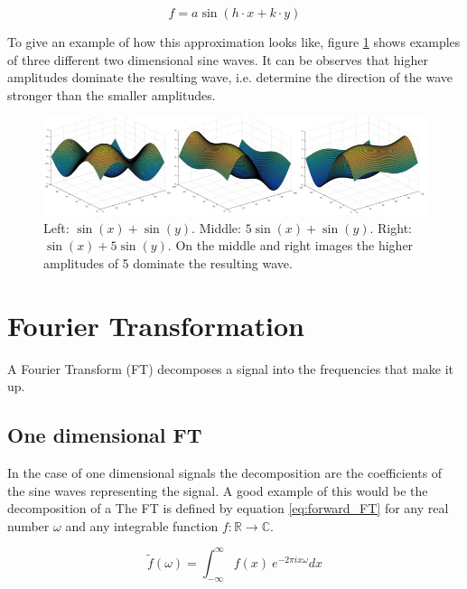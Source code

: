 \begin{equation}
	f = a \sin(h\cdot x+k\cdot y)
	\label{eq:2d_sine}
\end{equation}

To give an example of how this approximation looks like, figure \ref{fig:2d_sine} shows examples of three different two dimensional sine waves. It can be observes that higher amplitudes dominate the resulting wave, i.e. determine the direction of the wave stronger than the smaller amplitudes. 


\begin{figure}[!htb]
	\centering
	\includegraphics[width = \textwidth]{images/2d_sine.jpg}
	\caption{Left: $\sin(x) +\sin(y)$. Middle:  $5 \sin(x)+ \sin(y)$. Right: $	\sin(x)+5\sin(y)$. On the middle and right images the higher amplitudes of 5 dominate the resulting wave. \protect\footnotemark}
	\label{fig:2d_sine}
\end{figure}


\section{Fourier Transformation}

A Fourier Transform (FT) decomposes a signal into the frequencies that make it up.
\subsection{One dimensional FT} 

In the case of one dimensional signals the decomposition are the coefficients of the sine waves representing the signal. A good example of this would be the decomposition of a  The FT is defined by equation \ref{eq:forward_FT} for any real number $\omega$ and any integrable function $f:\mathbb{R} \rightarrow \mathbb{C}$. 

\begin{equation}
	\tilde{f}(\omega) = \int_{-\infty}^{\infty} f(x)\ e^{-2\pi i x \omega}dx
	\label{eq:forward_FT}
\end{equation} 

